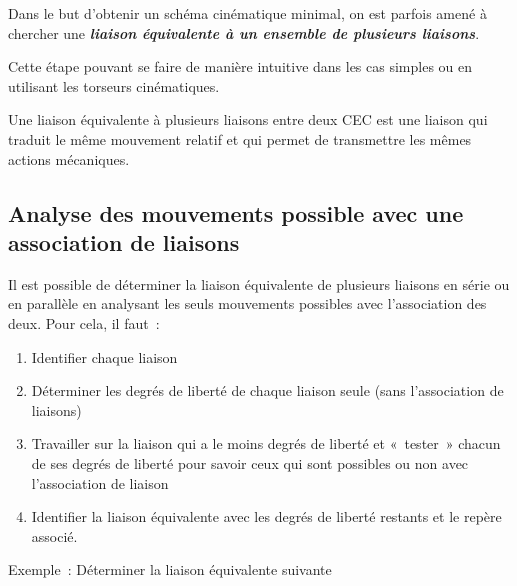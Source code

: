 Dans le but d'obtenir un schéma cinématique minimal, on est parfois
amené à chercher une \emph{\textbf{liaison équivalente à un ensemble de
plusieurs liaisons}}.

Cette étape pouvant se faire de manière intuitive dans les cas simples
ou en utilisant les torseurs cinématiques.

Une liaison équivalente à plusieurs liaisons entre deux CEC est une
liaison qui traduit le même mouvement relatif et qui permet de
transmettre les mêmes actions mécaniques.

\subsection{Analyse des mouvements possible avec une association de
liaisons}\label{analyse-des-mouvements-possible-avec-une-association-de-liaisons}

Il est possible de déterminer la liaison équivalente de plusieurs
liaisons en série ou en parallèle en analysant les seuls mouvements
possibles avec l'association des deux. Pour cela, il faut~:

\begin{enumerate}
\def\labelenumi{\arabic{enumi}.}
\item
  Identifier chaque liaison
\item
  Déterminer les degrés de liberté de chaque liaison seule (sans
  l'association de liaisons)
\item
  Travailler sur la liaison qui a le moins degrés de liberté et
  «~tester~» chacun de ses degrés de liberté pour savoir ceux qui sont
  possibles ou non avec l'association de liaison
\item
  Identifier la liaison équivalente avec les degrés de liberté restants
  et le repère associé.
\end{enumerate}

Exemple~: Déterminer la liaison équivalente suivante

